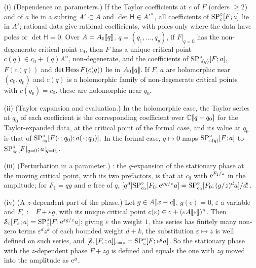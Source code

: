 \begin{lem}[Parameters]
\label{lem:fsp-param}
(i) (Dependence on parameters.) If the Taylor coefficients at $c$ of $F$ (orders $\geq2$) and of $a$ lie in a subring $A'\subset A$ and $\det\mathsf H\in A'^\times$, all coefficients of $\mathrm{SP}^{\circ}_c[F;a]$ lie in $A'$; rational data give rational coefficients, with poles only where the data have poles or $\det\mathsf H=0$. Over $A=A_0[\![ q ]\!]$, $q=(q_1,\dots,q_p)$, if $F|_{q=0}$ has the non-degenerate critical point $c_0$, then $F$ has a unique critical point $c(q)\in c_0+(q)A^n$, non-degenerate, and the coefficients of $\mathrm{SP}^{\circ}_{c(q)}[F;a]$, $F(c(q))$ and $\det\operatorname{Hess} F(c(q))$ lie in $A_0[\![ q ]\!]$. If $F$, $a$ are holomorphic near $(c_0,q_0)$ and $c(q)$ is a holomorphic family of non-degenerate critical points with $c(q_0)=c_0$, these are holomorphic near $q_0$.

(ii) (Taylor expansion and evaluation.) In the holomorphic case, the Taylor series at $q_0$ of each coefficient is the corresponding coefficient over $\mathbb{C}[\![ q-q_0 ]\!]$ for the Taylor-expanded data, at the critical point of the formal case, and its value at $q_0$ is that of $\mathrm{SP}^{\circ}_{c_0}[F(\cdot\,;q_0);a(\cdot\,;q_0)]$. In the formal case, $q\mapsto0$ maps $\mathrm{SP}^{\circ}_{c(q)}[F;a]$ to $\mathrm{SP}^{\circ}_{c_0}[F|_{q=0};a|_{q=0}]$.

(iii) (Perturbation in a parameter.) : the $q$-expansion of the stationary phase at the moving critical point, with its two prefactors, is that at $c_0$ with $\mathrm{e}^{F_1/z}$ in the amplitude; for $F_1=qg$ and $a$ free of $q$, $[q^d]\mathrm{SP}^{\circ}_{c_0}[F_0;\mathrm{e}^{qg/z}a]=\mathrm{SP}^{\circ}_{c_0}[F_0;(g/z)^da]/d!$.

(iv) (A $z$-dependent part of the phase.) Let $g\in A[\![ x-c ]\!]$, $g(c)=0$, $\varepsilon$ a variable and $F_\varepsilon:=F+\varepsilon g$, with its unique critical point $c(\varepsilon)\in c+(\varepsilon A[\![ \varepsilon ]\!])^n$. Then $\mathcal S_\varepsilon[F_\varepsilon;a]=\mathrm{SP}^{\circ}_c[F;\mathrm{e}^{\varepsilon g/z}a]$; giving $\varepsilon$ the weight $1$, this series has finitely many non-zero terms $\varepsilon^dz^k$ of each bounded weight $d+k$, the substitution $\varepsilon\mapsto z$ is well defined on such series, and $[\mathcal S_\varepsilon[F_\varepsilon;a]]_{\varepsilon=z}=\mathrm{SP}^{\circ}_c[F;\mathrm{e}^ga]$. So the stationary phase with the $z$-dependent phase $F+zg$ is defined and equals the one with $zg$ moved into the amplitude as $\mathrm{e}^g$.
\end{lem}

